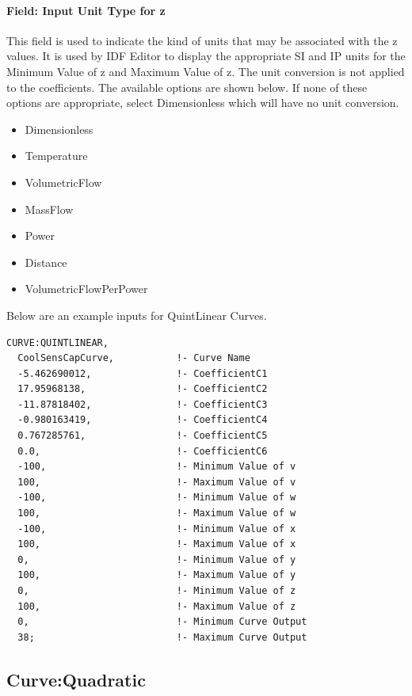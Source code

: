 \paragraph{Field: Input Unit Type for z}\label{field-input-unit-type-for-z-3}

This field is used to indicate the kind of units that may be associated with the z values. It is used by IDF Editor to display the appropriate SI and IP units for the Minimum Value of z and Maximum Value of z. The unit conversion is not applied to the coefficients. The available options are shown below. If none of these options are appropriate, select Dimensionless which will have no unit conversion.

\begin{itemize}
\item
  Dimensionless
\item
  Temperature
\item
  VolumetricFlow
\item
  MassFlow
\item
  Power
\item
  Distance
\item
  VolumetricFlowPerPower
\end{itemize}

Below are an example inputs for QuintLinear Curves.

\begin{lstlisting}
CURVE:QUINTLINEAR,
  CoolSensCapCurve,           !- Curve Name
  -5.462690012,               !- CoefficientC1
  17.95968138,                !- CoefficientC2
  -11.87818402,               !- CoefficientC3
  -0.980163419,               !- CoefficientC4
  0.767285761,                !- CoefficientC5
  0.0,                        !- CoefficientC6
  -100,                       !- Minimum Value of v
  100,                        !- Maximum Value of v
  -100,                       !- Minimum Value of w
  100,                        !- Maximum Value of w
  -100,                       !- Minimum Value of x
  100,                        !- Maximum Value of x
  0,                          !- Minimum Value of y
  100,                        !- Maximum Value of y
  0,                          !- Minimum Value of z
  100,                        !- Maximum Value of z
  0,                          !- Minimum Curve Output
  38;                         !- Maximum Curve Output
\end{lstlisting}

\subsection{Curve:Quadratic}\label{curvequadratic}

